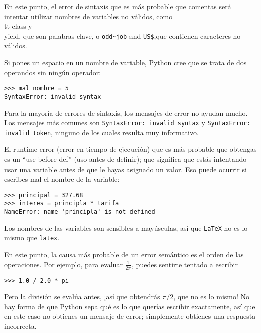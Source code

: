 En este punto, el error de sintaxis que es más probable que comentas será
intentar utilizar nombres de variables no válidos, como {\\tt class} y {\\ yield}, que
son palabras clave, o \verb"odd~job" and \verb"US$",que contienen
caracteres no válidos.


Si pones un espacio en un nombre de variable, Python cree que se trata
de dos operandos sin ningún operador:

\beforeverb
\begin{verbatim}
>>> mal nombre = 5
SyntaxError: invalid syntax
\end{verbatim}
\afterverb
%
Para la mayoría de errores de sintaxis, los mensajes de error no ayudan mucho.
Los mensajes más comunes son {\tt SyntaxError: invalid syntax} y
{\tt SyntaxError: invalid token}, ninguno de los cuales resulta muy informativo.


El runtime error (error en tiempo de ejecución) que es más probable que obtengas es un
``use before def'' (uso antes de definir); que significa que estás intentando usar una variable
antes de que le hayas asignado un valor. Eso puede ocurrir si escribes mal el nombre de la variable: 

\beforeverb
\begin{verbatim}
>>> principal = 327.68
>>> interes = principla * tarifa
NameError: name 'principla' is not defined
\end{verbatim}
\afterverb
%
Los nombres de las variables son sensibles a mayúsculas, así que {\tt LaTeX} no es
lo mismo que {\tt latex}.


En este punto, la causa más probable de un error semántico es
el orden de las operaciones. Por ejemplo, para evaluar $\frac{1}{2 \pi}$,
puedes sentirte tentado a escribir

\beforeverb
\begin{verbatim}
>>> 1.0 / 2.0 * pi
\end{verbatim}
\afterverb
%
Pero la división se evalúa antes, ¡así que obtendrás $\pi / 2$, que
no es lo mismo! No hay forma de que Python
sepa qué es lo que querías escribir exactamente, así que en este caso no
obtienes un mensaje de error; simplemente obtienes una respuesta incorrecta.

